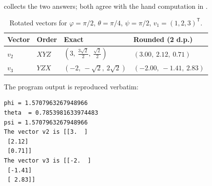  collects the two answers; both agree with the hand
computation in .

\begin{table}[ht]
\centering
\caption{Rotated vectors for $\varphi = \pi/2$, $\theta = \pi/4$, $\psi = \pi/2$,
         $v_1 = (1,2,3)^{\mathsf{T}}$.}
\label{tab:hw2-results}
\begin{tabular}{llll}
\toprule
Vector & Order & Exact & Rounded (2 d.p.) \\
\midrule
$v_2$ & $XYZ$ & $\left(3,\ \frac{3\sqrt{2}}{2},\ \frac{\sqrt{2}}{2}\right)$
      & $(3.00,\ 2.12,\ 0.71)$ \\
$v_3$ & $YZX$ & $\left(-2,\ -\sqrt{2},\ 2\sqrt{2}\right)$
      & $(-2.00,\ -1.41,\ 2.83)$ \\
\bottomrule
\end{tabular}
\end{table}

The program output is reproduced verbatim:

\begin{lstlisting}[style=shell,caption={Console output of the program.},label={lst:hw2-out}]
phi = 1.5707963267948966
theta  = 0.7853981633974483
psi = 1.5707963267948966
The vector v2 is [[3.  ]
 [2.12]
 [0.71]]
The vector v3 is [[-2.  ]
 [-1.41]
 [ 2.83]]
\end{lstlisting}

